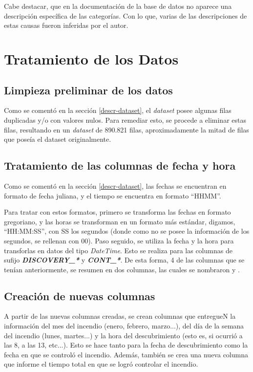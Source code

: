 Cabe destacar, que en la documentación de la base de datos no aparece una descripción específica de las categorías. Con lo que, varias de las descripciones de estas causas fueron inferidas por el autor.

\section{Tratamiento de los Datos}
\subsection{Limpieza preliminar de los datos}
Como se comentó en la sección \ref{descr-dataset}, el \textit{dataset} posee algunas filas duplicadas y/o con valores nulos. Para remediar esto, se procede a eliminar estas filas, resultando en un \textit{dataset} de 890.821 filas, aproximadamente la mitad de filas que poseía el dataset originalmente.

\subsection{Tratamiento de las columnas de fecha y hora}
Como se comentó en la sección \ref{descr-dataset}, las fechas se encuentran en formato de fecha juliana, y el tiempo se encuentra en formato ``HHMM''.

Para tratar con estos formatos, primero se transforma las fechas en formato gregoriano, y las horas se transforman en un formato más estándar, digamos, ``HH:MM:SS'', con SS los segundos (donde como no se posee la información de los segundos, se rellenan con 00). Paso seguido, se utiliza la fecha y la hora para transforlas en datos del tipo \textit{DateTime}. Esto se realiza para las columnas de sufijo \textit{\textbf{DISCOVERY\_*}} y \textit{\textbf{CONT\_*}}. De esta forma, 4 de las columnas que se tenían anteriormente, se resumen en dos columnas, las cuales se nombraron  y .

\subsection{Creación de nuevas columnas}
A partir de las nuevas columnas creadas, se crean columnas que entregueN la información del mes del incendio (enero, febrero, marzo...), del día de la semana del incendio (lunes, martes...) y la hora del descubrimiento (esto es, si ocurrió a las 8, a las 13, etc...). Esto se hace tanto para la fecha de descubrimiento como la fecha en que se controló el incendio. Además, también se crea una nueva columna que informe el tiempo total en que se logró controlar el incendio. 

